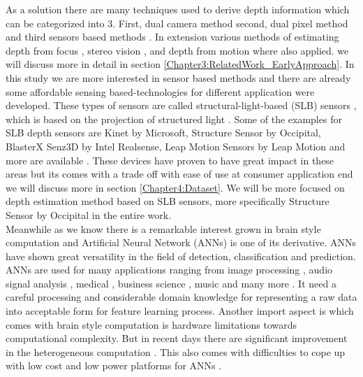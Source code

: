 As a solution there are many techniques used to derive depth information which can be categorized into 3. First, dual camera method \cite{li2009dual} second,  dual pixel method \cite{martinello2015dual, choi2017all} and  third sensors based methods \cite{salvi2004pattern}. In extension various methods of estimating depth from focus \cite{grossmann1987depth}, stereo vision \cite{bulthoff1988integration}, and depth from motion \cite{ullman1979interpretation} where also applied. we will discuss more in detail in section \ref{Chapter3:RelatedWork_EarlyApproach}. In this study we are more interested in sensor based methods and there are already some affordable sensing based-technologies for different application were developed. These types of sensors are called structural-light-based (SLB) sensors \cite{salvi2004pattern}, which is based on the projection of structured light \cite{zhang2012microsoft}. Some of the examples for SLB depth sensors are Kinet by Microsoft, Structure Sensor by Occipital, BlasterX Senz3D by Intel Realsense, Leap Motion Sensors by Leap Motion \cite{marin2014hand} and more are available \cite{mal2018sparse}. These devices have proven to have great impact in these areas but its comes with a trade off with ease of use at consumer application end we will discuss more in section \ref{Chapter4:Dataset}. We will be more focused on depth estimation method based on SLB sensors, more specifically Structure Sensor by Occipital in the entire work.\\

Meanwhile as we know there is a remarkable interest grown in brain style computation and Artificial Neural Network (ANNs) is one of its derivative. ANNs have shown great versatility in the field of detection, classification and prediction. ANNs are used for many applications ranging from image processing \cite{guyon1991applications} , audio signal analysis \cite{bourlard1993continuous}, medical \cite{baxt1990use}, business science \cite{widrow1994neural}, music \cite{nadar2019towards} and many more \cite{zhang2000neural}. It  need a careful processing and considerable domain knowledge for representing a raw data into acceptable form for feature learning process. Another import aspect is which comes with brain style computation is hardware limitations towards computational complexity. But in recent days there are significant improvement in the heterogeneous computation \cite{mittal2015survey}. This also comes with difficulties to cope up with low cost and low power platforms for ANNs \cite{mittal2019survey}. \\




